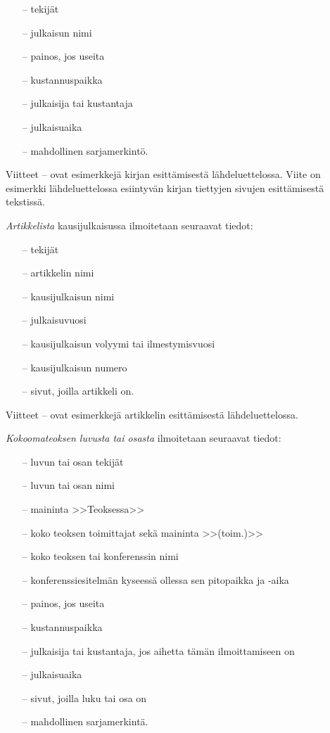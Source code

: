 \documentclass[english, 12pt, a4paper, elec, utf8, a-1b, online]{aaltothesis}
\begin{document}
\begin{itemize}
\item[--]tekij\"at 
\item[--]julkaisun nimi
\item[--]painos, jos useita
\item[--]kustannuspaikka
\item[--]julkaisija tai kustantaja
\item[--]julkaisuaika
\item[--]mahdollinen sarjamerkint\"o. 
\end{itemize}

Viitteet \cite{Kauranen}--\cite{Koblitz} ovat esimerkkej\"a kirjan
esitt\"amisest\"a l\"ahdeluettelossa. Viite \cite[s.\ 83--124]{Koblitz} on
esimerkki l\"ahdeluettelossa esiintyv\"an kirjan tiettyjen sivujen
esitt\"amisest\"a tekstiss\"a.

\textit{Artikkelista} kausijulkaisussa ilmoitetaan seuraavat tiedot:

\begin{itemize}

\item[--]tekij\"at
\item[--]artikkelin nimi
\item[--]kausijulkaisun nimi
\item[--]julkaisuvuosi
\item[--]kausijulkaisun volyymi tai ilmestymisvuosi
\item[--]kausijulkaisun numero
\item[--]sivut, joilla artikkeli on.
\end{itemize}

Viitteet \cite{bcs}--\cite{Deschamps} ovat esimerkkej\"a artikkelin
esitt\"amisest\"a l\"ahdeluettelossa.

\textit{Kokoomateoksen luvusta tai osasta} ilmoitetaan seuraavat tiedot:

\begin{itemize}
\item[--]luvun tai osan tekij\"at
\item[--]luvun tai osan nimi
\item[--]maininta >>Teoksessa>>
\item[--]koko teoksen toimittajat sek\"a maininta >>(toim.)>>
\item[--]koko teoksen tai konferenssin nimi
\item[--]konferenssiesitelm\"an kyseess\"a ollessa sen pitopaikka ja -aika
\item[--]painos, jos useita
\item[--]kustannuspaikka
\item[--]julkaisija tai kustantaja, jos aihetta t\"am\"an ilmoittamiseen on
\item[--]julkaisuaika
\item[--]sivut, joilla luku tai osa on 
\item[--]mahdollinen sarjamerkint\"a.
\end{itemize}
\end{document}
